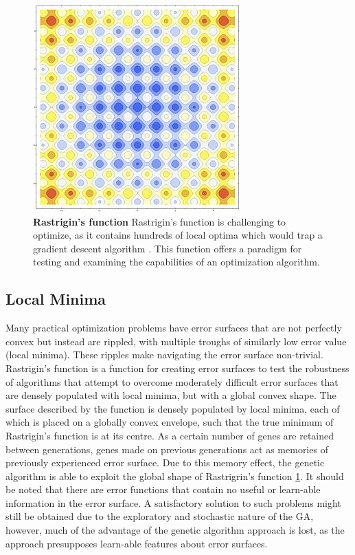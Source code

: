 \begin{figure}
\begin{center}

\includegraphics[scale=0.85]{figures/rastagrind.jpg}
\caption[Rastrigin's function]{\textbf{Rastrigin's function} Rastrigin's function is challenging to optimize, as it contains hundreds of local optima which would trap a gradient descent algorithm \citep{rastrigin1974systems}. This function offers a paradigm for testing and examining the capabilities of an optimization algorithm.}
\label{fig:rastrigin}
\end{center}

\end{figure}

\subsection{Local Minima} Many practical optimization problems have error surfaces that are not perfectly convex but instead are rippled, with multiple troughs of similarly low error value (local minima).
These ripples make navigating the error surface non-trivial.
Rastrigin's function \citep{rastrigin1974systems}  is a function for creating error surfaces to test the robustness of algorithms that attempt to overcome moderately difficult error surfaces that are densely populated with local minima, but with a global convex shape.
The surface described by the function is densely populated by local minima, each of which is placed on a globally convex envelope, such that the true minimum of Rastrigin's function is at its centre. As a certain number of genes are retained between generations, genes made on previous generations act as memories of previously experienced error surface. Due to this memory effect, the genetic algorithm is able to exploit the global shape of Rastrigrin's function \ref{fig:rastrigin}. It should be noted that there are error functions that contain no useful or learn-able information in the error surface. A satisfactory solution to such problems might still be obtained due to the exploratory and stochastic nature of the GA, however, much of the advantage of the genetic algorithm approach is lost, as the approach presupposes learn-able features about error surfaces. 


